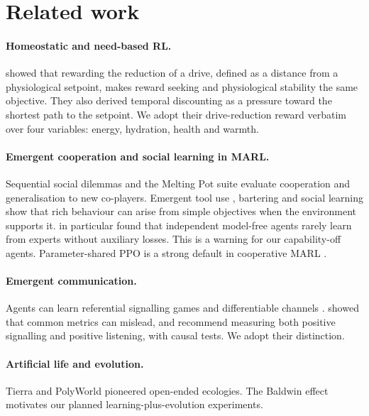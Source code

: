 \documentclass[10pt]{article}
\begin{document}
\section{Related work}
\label{sec:related}

\paragraph{Homeostatic and need-based RL.}
\citet{keramati2014homeostatic} showed that rewarding the reduction of a drive, defined as a distance from a
physiological setpoint, makes reward seeking and physiological stability the same objective. They also derived
temporal discounting as a pressure toward the shortest path to the setpoint. We adopt their drive-reduction reward
verbatim over four variables: energy, hydration, health and warmth.

\paragraph{Emergent cooperation and social learning in MARL.}
Sequential social dilemmas \citep{leibo2017ssd} and the Melting Pot suite \citep{leibo2021meltingpot} evaluate
cooperation and generalisation to new co-players. Emergent tool use \citep{baker2020tooluse}, bartering
\citep{johanson2022bartering} and social learning \citep{ndousse2021social,bhoopchand2023cultural} show that rich
behaviour can arise from simple objectives when the environment supports it. \citet{ndousse2021social} in particular
found that independent model-free agents rarely learn from experts without auxiliary losses. This is a warning for
our capability-off agents. Parameter-shared PPO is a strong default in cooperative MARL \citep{yu2022mappo}.

\paragraph{Emergent communication.}
Agents can learn referential signalling games \citep{lazaridou2017emergence} and differentiable channels
\citep{foerster2016communicate}. \citet{lowe2019pitfalls} showed that common metrics can mislead, and recommend
measuring both positive signalling and positive listening, with causal tests. We adopt their distinction.

\paragraph{Artificial life and evolution.}
Tierra \citep{ray1991tierra} and PolyWorld \citep{yaeger1994polyworld} pioneered open-ended ecologies. The Baldwin
effect \citep{hinton1987baldwin} motivates our planned learning-plus-evolution experiments.
\end{document}
